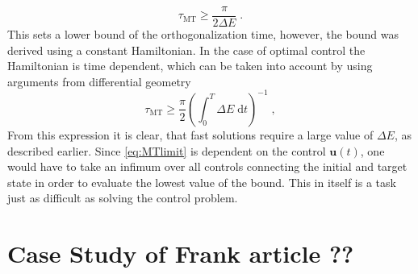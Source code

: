\begin{equation}
	\tau_{\mathrm{MT}} \geq \frac{\pi}{2 \Delta E} \; .
\end{equation}
This sets a lower bound of the orthogonalization time, however, the bound was derived using a constant Hamiltonian. In the case of optimal control the Hamiltonian is time dependent, which can be taken into account by using arguments from differential geometry \cite{Aharonov,beyondQSL}
\begin{equation}
	\tau_{\mathrm{MT}} \geq \frac{\pi}{2} \left( \int_{0}^{T} \Delta E \; \mathrm{d}t \right) ^{-1} \; , \label{eq:MTlimit}
\end{equation}
From this expression it is clear, that fast solutions require a large value of $\Delta E$, as described earlier. Since \ref{eq:MTlimit} is dependent on the control $\boldsymbol{u}(t)$, one would have to take an infimum over all controls connecting the initial and target state in order to evaluate the lowest value of the bound. This in itself is a task just as difficult as solving the control problem.


\section{Case Study of Frank article ??}


